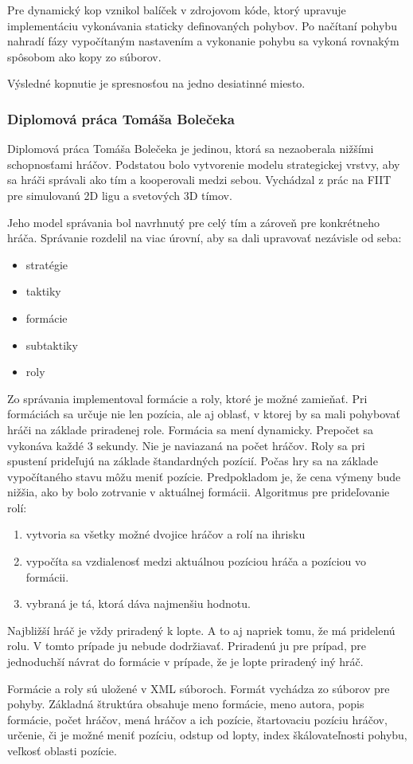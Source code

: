 Pre dynamický kop vznikol balíček v zdrojovom kóde, ktorý upravuje implementáciu vykonávania staticky definovaných pohybov. Po načítaní pohybu nahradí fázy vypočítaným nastavením a vykonanie pohybu sa vykoná rovnakým spôsobom ako kopy zo súborov.

Výsledné kopnutie je spresnosťou na jedno desiatinné miesto.

\subsubsection{Diplomová práca Tomáša Bolečeka}
Diplomová práca Tomáša Bolečeka \cite{bolecek} je jedinou, ktorá sa nezaoberala nižšími schopnosťami hráčov. Podstatou bolo vytvorenie modelu strategickej vrstvy, aby sa hráči správali ako tím a kooperovali medzi sebou. Vychádzal z prác na FIIT pre simulovanú 2D ligu a svetových 3D tímov. 

Jeho model správania bol navrhnutý pre celý tím a zároveň pre konkrétneho hráča. Správanie rozdelil na viac úrovní, aby sa dali upravovať nezávisle od seba:
\begin{itemize}
\item stratégie
\item taktiky
\item formácie
\item subtaktiky
\item roly
\end{itemize}
Zo správania implementoval formácie a roly, ktoré je možné zamieňať. Pri formáciách sa určuje nie len pozícia, ale aj oblasť, v ktorej by sa mali pohybovať hráči na základe priradenej role. Formácia sa mení dynamicky. Prepočet sa vykonáva každé 3 sekundy. Nie je naviazaná na počet hráčov. Roly sa pri spustení prideľujú na základe štandardných pozícií. Počas hry sa na základe vypočítaného stavu môžu meniť pozície. Predpokladom je, že cena výmeny bude nižšia, ako by bolo zotrvanie v aktuálnej formácii. Algoritmus pre prideľovanie rolí:
\begin{enumerate}
\item vytvoria sa všetky možné dvojice hráčov a rolí na ihrisku
\item vypočíta sa vzdialenosť medzi aktuálnou pozíciou hráča a pozíciou vo formácii.
\item vybraná je tá, ktorá dáva najmenšiu hodnotu.
\end{enumerate}
Najbližší hráč je vždy priradený k lopte. A to aj napriek tomu, že má pridelenú rolu. V tomto prípade ju nebude dodržiavať. Priradenú ju pre prípad, pre jednoduchší návrat do formácie v prípade, že je lopte priradený iný hráč.

Formácie a roly sú uložené v XML súboroch. Formát vychádza zo súborov pre pohyby. Základná štruktúra obsahuje meno formácie, meno autora, popis formácie, počet hráčov, mená hráčov a ich pozície, štartovaciu pozíciu hráčov, určenie, či je možné meniť pozíciu, odstup od lopty, index škálovateľnosti pohybu, veľkosť oblasti pozície.



